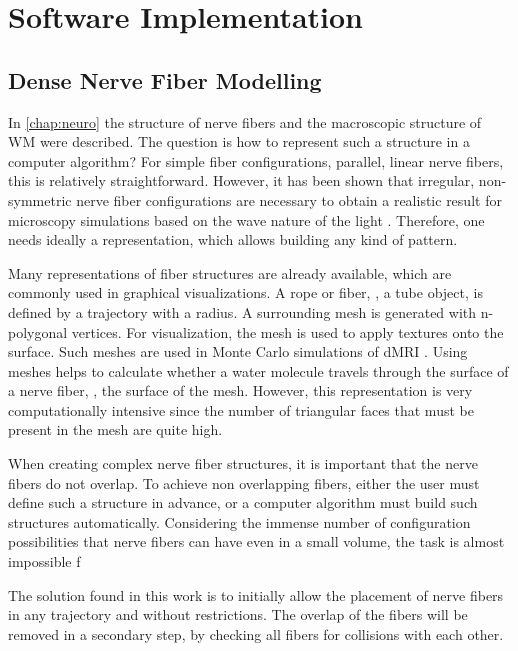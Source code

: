 \newpage\null\thispagestyle{empty}\newpage
\clearpage{\thispagestyle{empty}\cleardoublepage}
\part{Software Implementation}
\parttoc
% 
% 
% 
\setcounter{chapter}{4}
\chapter{Dense Nerve Fiber Modelling}
\label{chap:sof:modelling}
% 
In \cref{chap:neuro} the structure of nerve fibers and the macroscopic structure of \ac{WM} were described.
The question is how to represent such a structure in a computer algorithm?
For simple fiber configurations, \eg{} parallel, linear nerve fibers, this is relatively straightforward.
However, it has been shown that irregular, non-symmetric nerve fiber configurations are necessary to obtain a realistic result for microscopy simulations based on the wave nature of the light \cite{MenzelDissertation}.
Therefore, one needs ideally a representation, which allows building any kind of pattern.
\par
%
Many representations of fiber structures are already available, which are commonly used in graphical visualizations.
A rope or fiber, \ie{}, a tube object, is defined by a trajectory with a radius.
A surrounding mesh is generated with n-polygonal vertices.
For visualization, the mesh is used to apply textures onto the surface.
Such meshes are \eg{} used in Monte Carlo simulations of \ac{dMRI} \cite{Ginsburger2019,ginsburgerDis2019}.
Using meshes helps to calculate whether a water molecule travels through the surface of a nerve fiber, \ie{}, the surface of the mesh.
However, this representation is very computationally intensive since the number of triangular faces that must be present in the mesh are quite high.
\par
%
When creating complex nerve fiber structures, it is important that the nerve fibers do not overlap.
To achieve non overlapping fibers, either the user must define such a structure in advance, or a computer algorithm must build such structures automatically.
Considering the immense number of configuration possibilities that nerve fibers can have even in a small volume, the task is almost impossible f
\par
%
The solution found in this work is to initially allow the placement of nerve fibers in any trajectory and without restrictions.
The overlap of the fibers will be removed in a secondary step, by checking all fibers for collisions with each other.
